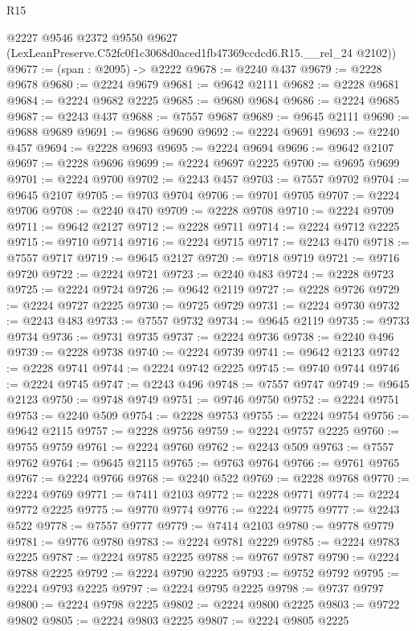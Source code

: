 \begin{lexlean}{R15}
\begin{coremodule}
      @2227
      @9546
      @2372
      @9550
      @9627
      (LexLeanPreserve.C52fc0f1c3068d0aced1fb47369ccdcd6.R15.__rel_24 @2102))
@9677 := (span : @2095) -> @2222
@9678 := @2240 @437
@9679 := @2228 @9678
@9680 := @2224 @9679
@9681 := @9642 @2111
@9682 := @2228 @9681
@9684 := @2224 @9682 @2225
@9685 := @9680 @9684
@9686 := @2224 @9685
@9687 := @2243 @437
@9688 := @7557 @9687
@9689 := @9645 @2111
@9690 := @9688 @9689
@9691 := @9686 @9690
@9692 := @2224 @9691
@9693 := @2240 @457
@9694 := @2228 @9693
@9695 := @2224 @9694
@9696 := @9642 @2107
@9697 := @2228 @9696
@9699 := @2224 @9697 @2225
@9700 := @9695 @9699
@9701 := @2224 @9700
@9702 := @2243 @457
@9703 := @7557 @9702
@9704 := @9645 @2107
@9705 := @9703 @9704
@9706 := @9701 @9705
@9707 := @2224 @9706
@9708 := @2240 @470
@9709 := @2228 @9708
@9710 := @2224 @9709
@9711 := @9642 @2127
@9712 := @2228 @9711
@9714 := @2224 @9712 @2225
@9715 := @9710 @9714
@9716 := @2224 @9715
@9717 := @2243 @470
@9718 := @7557 @9717
@9719 := @9645 @2127
@9720 := @9718 @9719
@9721 := @9716 @9720
@9722 := @2224 @9721
@9723 := @2240 @483
@9724 := @2228 @9723
@9725 := @2224 @9724
@9726 := @9642 @2119
@9727 := @2228 @9726
@9729 := @2224 @9727 @2225
@9730 := @9725 @9729
@9731 := @2224 @9730
@9732 := @2243 @483
@9733 := @7557 @9732
@9734 := @9645 @2119
@9735 := @9733 @9734
@9736 := @9731 @9735
@9737 := @2224 @9736
@9738 := @2240 @496
@9739 := @2228 @9738
@9740 := @2224 @9739
@9741 := @9642 @2123
@9742 := @2228 @9741
@9744 := @2224 @9742 @2225
@9745 := @9740 @9744
@9746 := @2224 @9745
@9747 := @2243 @496
@9748 := @7557 @9747
@9749 := @9645 @2123
@9750 := @9748 @9749
@9751 := @9746 @9750
@9752 := @2224 @9751
@9753 := @2240 @509
@9754 := @2228 @9753
@9755 := @2224 @9754
@9756 := @9642 @2115
@9757 := @2228 @9756
@9759 := @2224 @9757 @2225
@9760 := @9755 @9759
@9761 := @2224 @9760
@9762 := @2243 @509
@9763 := @7557 @9762
@9764 := @9645 @2115
@9765 := @9763 @9764
@9766 := @9761 @9765
@9767 := @2224 @9766
@9768 := @2240 @522
@9769 := @2228 @9768
@9770 := @2224 @9769
@9771 := @7411 @2103
@9772 := @2228 @9771
@9774 := @2224 @9772 @2225
@9775 := @9770 @9774
@9776 := @2224 @9775
@9777 := @2243 @522
@9778 := @7557 @9777
@9779 := @7414 @2103
@9780 := @9778 @9779
@9781 := @9776 @9780
@9783 := @2224 @9781 @2229
@9785 := @2224 @9783 @2225
@9787 := @2224 @9785 @2225
@9788 := @9767 @9787
@9790 := @2224 @9788 @2225
@9792 := @2224 @9790 @2225
@9793 := @9752 @9792
@9795 := @2224 @9793 @2225
@9797 := @2224 @9795 @2225
@9798 := @9737 @9797
@9800 := @2224 @9798 @2225
@9802 := @2224 @9800 @2225
@9803 := @9722 @9802
@9805 := @2224 @9803 @2225
@9807 := @2224 @9805 @2225

\end{coremodule}
\end{lexlean}
